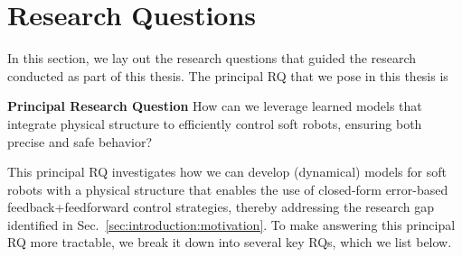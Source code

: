 \section{Research Questions}\label{sec:introduction:research_questions}
In this section, we lay out the research questions that guided the research conducted as part of this thesis.
The principal \gls{RQ} that we pose in this thesis is
\begin{titled-frame}{\textbf{Principal Research Question}}
    \noindent How can we leverage learned models that integrate physical structure to efficiently control soft robots, ensuring both precise and safe behavior?
\end{titled-frame}
This principal \gls{RQ} investigates how we can develop (dynamical) models for soft robots with a physical structure that enables the use of closed-form error-based feedback+feedforward control strategies, thereby addressing the research gap identified in Sec.~\ref{sec:introduction:motivation}. To make answering this principal \gls{RQ} more tractable, we break it down into several key \glspl{RQ}, which we list below.


